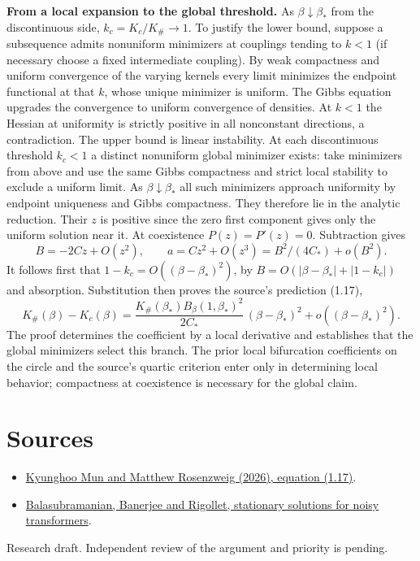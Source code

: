\documentclass[10pt]{article}
\begin{document}
\textbf{From a local expansion to the global threshold.} As $\beta\downarrow\beta_*$ from the discontinuous side, $k_c=K_c/K_\#\to1$. To justify the lower bound, suppose a subsequence admits nonuniform minimizers at couplings tending to $k<1$ (if necessary choose a fixed intermediate coupling). By weak compactness and uniform convergence of the varying kernels every limit minimizes the endpoint functional at that $k$, whose unique minimizer is uniform. The Gibbs equation upgrades the convergence to uniform convergence of densities. At $k<1$ the Hessian at uniformity is strictly positive in all nonconstant directions, a contradiction. The upper bound is linear instability. At each discontinuous threshold $k_c<1$ a distinct nonuniform global minimizer exists: take minimizers from above and use the same Gibbs compactness and strict local stability to exclude a uniform limit. As $\beta\downarrow\beta_*$ all such minimizers approach uniformity by endpoint uniqueness and Gibbs compactness. They therefore lie in the analytic reduction. Their $z$ is positive since the zero first component gives only the uniform solution near it. At coexistence $P(z)=P'(z)=0$. Subtraction gives
\[
 B=-2Cz+O(z^2),\qquad a=Cz^2+O(z^3)=B^2/(4C_*)+o(B^2).
\]
It follows first that $1-k_c=O((\beta-\beta_*)^2)$, by $B=O(|\beta-\beta_*|+|1-k_c|)$ and absorption. Substitution then proves the source's prediction (1.17),
\[
 K_\#(\beta)-K_c(\beta)=
 \frac{K_\#(\beta_*)B_\beta(1,\beta_*)^2}{2C_*}\,(\beta-\beta_*)^2
 +o((\beta-\beta_*)^2).
\]
The proof determines the coefficient by a local derivative and establishes that the global minimizers select this branch. The prior local bifurcation coefficients on the circle and the source's quartic criterion enter only in determining local behavior; compactness at coexistence is necessary for the global claim.

\section*{Sources}
\begin{itemize}
\item \href{https://arxiv.org/abs/2606.05140}{Kyunghoo Mun and Matthew Rosenzweig (2026), equation (1.17)}.
\item \href{https://arxiv.org/abs/2510.20094}{Balasubramanian, Banerjee and Rigollet, stationary solutions for noisy transformers}.
\end{itemize}
{\small Research draft. Independent review of the argument and priority is pending.}
\end{document}
